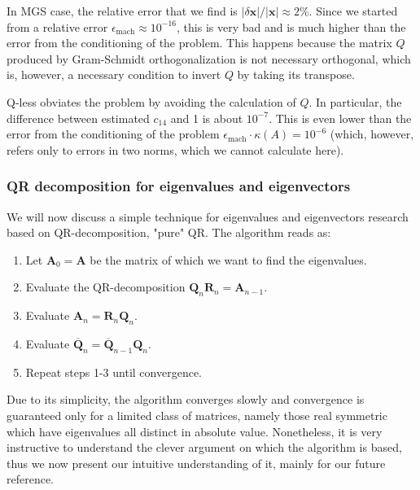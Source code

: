 \documentclass[a4paper,11]{article}
\newcommand{\emach}{\epsilon_{\text{mach}}}
\newcommand{\bA}{\mathbf{A}}
\newcommand{\bQ}{\mathbf{Q}}
\newcommand{\bR}{\mathbf{R}}
\begin{document}
In MGS case, the relative error that we find is 
$|\delta \mathbf x|/|\mathbf x| \approx 2\%$. Since we started from a relative 
error $\emach \approx 10^{-16}$, this is very bad and is much higher than the 
error from the conditioning of the problem. This happens because the matrix 
$Q$ produced by Gram-Schmidt orthogonalization is not necessary orthogonal, 
which is, however, a necessary condition to invert $Q$ by taking its transpose.

Q-less obviates the problem by avoiding the calculation of $Q$. 
In particular, the difference between estimated $c_{14}$ and 1 
is about $10^{-7}$. This is even lower than the error from the conditioning 
of the problem $\emach \cdot \kappa (A) = 10^{-6}$ (which, however, refers 
only to errors in two norms, which we cannot calculate here).

\subsubsection{QR decomposition for eigenvalues and eigenvectors}




We will now discuss a simple technique for eigenvalues 
and eigenvectors research based on QR-decomposition, "pure" QR. The algorithm 
reads as:
%
\begin{enumerate}
	\item[]{
		Let $\bA_{0}=\bA$ be the matrix of which we want to find the eigenvalues.
	}
	\item{
		Evaluate the QR-decomposition
			$\bQ_{n}\bR_{n}=\bA_{n-1}$.
		}
	\item{
		Evaluate $\bA_{n}=\bR_{n}\bQ_{n}$.
	}
	\item{
		Evaluate $\overline{\bQ}_{n}=\overline{\bQ}_{n-1}\bQ_{n}$.
	}
	\item[]{
		Repeat steps 1-3 until convergence.
	}
\end{enumerate}
%
Due to its simplicity, the algorithm converges slowly and convergence 
is guaranteed only for a limited class of matrices, namely those real symmetric 
which have eigenvalues all distinct in absolute value. Nonetheless, it is very 
instructive to understand the clever argument on which the algorithm is based,
thus we now present our intuitive understanding of it, mainly for our future 
reference.
\end{document}
